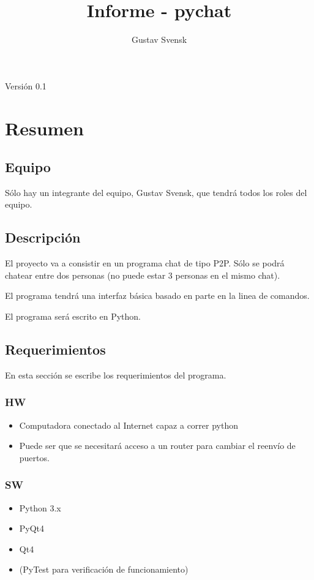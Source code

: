 \documentclass[a4paper, 12pt]{article}
\title{Informe - pychat}
\author{Gustav Svensk}
\begin{document}
\cfoot{\thepage}
\renewcommand{\headrulewidth}{0.4pt}


\maketitle
\thispagestyle{empty}
\begin{center}
        {\large Versión 0.1}
\end{center}
\newpage

\setcounter{page}{1}
\tableofcontents
\listoftables
\listoffigures
\newpage

\section{Resumen}
\subsection{Equipo}
Sólo hay un integrante del equipo, Gustav Svensk, que tendrá todos los roles del
equipo.
\subsection{Descripción}
El proyecto va a consistir en un programa chat de tipo P2P. Sólo se
podrá chatear entre dos personas (no puede estar 3 personas en el mismo
chat).

El programa tendrá una interfaz básica basado en parte en la linea de comandos.

El programa será escrito en Python.
\subsection{Requerimientos}
En esta sección se escribe los requerimientos del programa.
\subsubsection{HW}
\begin{itemize}
        \item Computadora conectado al Internet capaz a correr python
        \item Puede ser que se necesitará acceso a un router para cambiar el
                reenvío de puertos.
\end{itemize}
\subsubsection{SW}
\begin{itemize}
        \item Python 3.x
        \item PyQt4
        \item Qt4
        \item (PyTest para verificación de funcionamiento)
\end{itemize}
\end{document}
